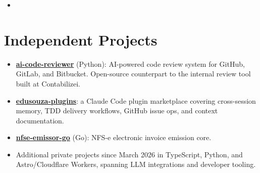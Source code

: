 \documentclass[11pt,a4paper,sans]{moderncv}
\begin{document}
\begin{itemize}
\vspace{3pt}

\item{}

\end{itemize}


\section{Independent Projects}
\vspace{1pt}
\begin{itemize}

\item \textbf{\href{https://github.com/edusouza/ai-code-reviewer}{ai-code-reviewer}} (Python): AI-powered code review system for GitHub, GitLab, and Bitbucket. Open-source counterpart to the internal review tool built at Contabilizei.

\item \textbf{\href{https://github.com/edusouza/edusouza-plugins}{edusouza-plugins}}: a Claude Code plugin marketplace covering cross-session memory, TDD delivery workflows, GitHub issue ops, and context documentation.

\item \textbf{\href{https://github.com/edusouza/nfse-emissor-go}{nfse-emissor-go}} (Go): NFS-e electronic invoice emission core.

\item Additional private projects since March 2026 in TypeScript, Python, and Astro/Cloudflare Workers, spanning LLM integrations and developer tooling.

\end{itemize}

\end{document}
